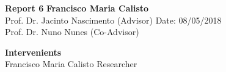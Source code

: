 \documentclass[a4paper, 11pt]{article}
\begin{document}
\noindent
\large\textbf{Report 6} \hfill \textbf{Francisco Maria Calisto} \\
\normalsize
Prof. Dr. Jacinto Nascimento (Advisor) \hfill Date: 08/05/2018 \\
Prof. Dr. Nuno Nunes (Co-Advisor) \hfill

\hfill

\noindent
\large\textbf{Intervenients} \hfill \\
Francisco Maria Calisto \hfill Researcher \\






\clearpage



\end{document}
